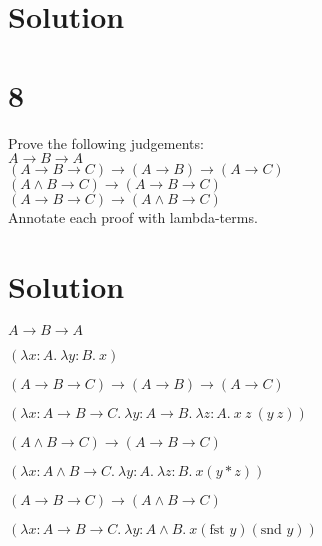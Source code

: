 \documentclass[10pt]{article}
\begin{document}
\section*{Solution}

\section*{8}

Prove the following judgements:\\
$A\to B \to A$\\
$(A\to B \to C) \to (A\to B )\to (A\to C)$\\
$(A \land B \to C )\to(A\to B \to C)$\\
$(A\to B\to C)\to (A\land B \to C)$\\
Annotate each proof with lambda-terms.

\section*{Solution}

\begin{description*}
\item[] $A\to B \to A$

$(\lambda x: A.\ \lambda y: B.\ x)$


\item[] $(A\to B \to C) \to (A\to B )\to (A\to C)$

$(\lambda x: A\to B\to C.\ \lambda y: A\to B.\ \lambda z: A.\ x\ z\ (y\ z))$

\item[] $(A \land B \to C )\to(A\to B \to C)$

$(\lambda x: A\land B \to C .\ \lambda y: A.\ \lambda z: B.\ x (y*z))$

\item[] $(A\to B\to C)\to (A\land B \to C)$

$(\lambda x: A\to B\to C.\ \lambda y: A\land B.\ x(\text{fst } y)(\text{snd } y))$


\end{description*}
\end{document}

